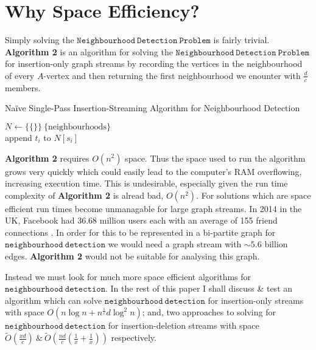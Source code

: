 \documentclass[11pt,twoside,a4paper]{report}
\begin{document}
\section{Why Space Efficiency?}
Simply solving the $\mathtt{Neighbourhood\ Detection\ Problem}$ is fairly trivial. \textbf{Algorithm 2} is an algorithm for solving the $\mathtt{Neighbourhood\ Detection\ Problem}$ for insertion-only graph streams by recording the vertices in the neighbourhood of every $A$-vertex and then returning the first neighbourhood we enounter with $\frac{d}{c}$ members.\\
\begin{algorithm}[H]
\caption{Na\"ive Single-Pass Insertion-Streaming Algorithm for Neighbourhood Detection}
$N\leftarrow\{\{\}\}\ \{\text{neighbourhoods}\}$\\
 {
	append $t_i$ to $N[s_i]$\\
	 {
	}
}
\end{algorithm}
\par\textbf{Algorithm 2} requires $O\left(n^2\right)$ space. Thus the space used to run the algorithm grows very quickly which could easily lead to the computer's RAM overflowing, increasing execution time. This is undesirable, especially given the run time complexity of \textbf{Algorithm 2} is alread bad, $O(n^2)$. %
For solutions which are space efficient run times become unmanagable for large graph streams. In 2014 in the UK, Facebook had 36.68 million users \cite{users16} each with an average of 155 friend connections \cite{friends16}. In order for this to be represented in a bi-partite graph for $\mathtt{neighbourhood\ detection}$ we would need a graph stream with ${\sim}5.6$ billion edges. \textbf{Algorithm 2} would not be suitable for analysing this graph.
\par Instead we must look for much more space efficient algorithms for\\
$\mathtt{neighbourhood\ detection}$. In the rest of this paper I shall discuss \& test an algorithm which can solve $\mathtt{neighbourhood\ detection}$ for insertion-only streams with space $O(n\log n+n^{\frac1c}d\log^2n)$; and, two approaches to solving for $\mathtt{neighbourhood\ detection}$ for insertion-deletion streams with space $\tilde O\left(\frac{xd}{c}\right)\ \&\ \tilde O\left(\frac{nd}{c}\left(\frac1x+\frac1x\right)\right)$ respectively.
\end{document}
